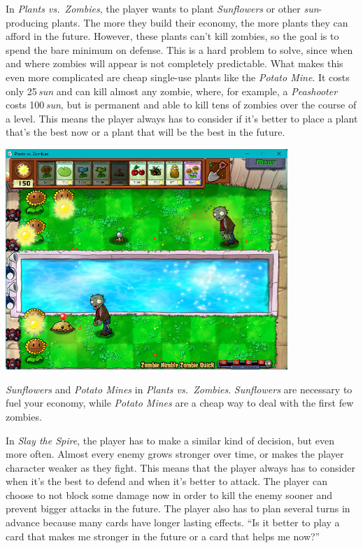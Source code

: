 In \emph{Plants vs.\ Zombies}, the player wants to plant \emph{Sunflowers} or other \emph{sun}-producing plants.
The more they build their economy, the more plants they can afford in the future.
However, these plants can't kill zombies, so the goal is to spend the bare minimum on defense.
This is a hard problem to solve, since when and where zombies will appear is not completely predictable.
What makes this even more complicated are cheap single-use plants like the \emph{Potato Mine}.
It costs only 25\,\emph{sun} and can kill almost any zombie, where, for example, a \emph{Peashooter} costs 100\,\emph{sun}, but is permanent and able to kill tens of zombies over the course of a level.
This means the player always has to consider if it's better to place a plant that's the best now or a plant that will be the best in the future.

\begin{center}
    \captionsetup{type=figure}
    \includegraphics[width=0.8\textwidth]{img/Plants-vs-Zombies-Mines.png}
    \caption{\emph{Sunflowers} and \emph{Potato Mines} in \emph{Plants vs.\ Zombies}. \emph{Sunflowers} are necessary to fuel your economy, while \emph{Potato Mines} are a cheap way to deal with the first few zombies.}
    \label{fig:pvz-mines}
\end{center}

In \emph{Slay the Spire}, the player has to make a similar kind of decision, but even more often.
Almost every enemy grows stronger over time, or makes the player character weaker as they fight.
This means that the player always has to consider when it's the best to defend and when it's better to attack.
The player can choose to not block some damage now in order to kill the enemy sooner and prevent bigger attacks in the future.
The player also has to plan several turns in advance because many cards have longer lasting effects.
\enquote{Is it better to play a card that makes me stronger in the future or a card that helps me now?}

